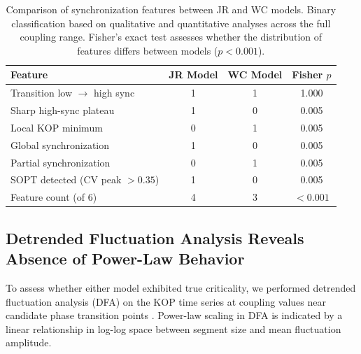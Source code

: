 \documentclass[11pt]{article}
\begin{document}
\begin{table}[H]
\centering
\caption{Comparison of synchronization features between JR and WC models. Binary classification based on qualitative and quantitative analyses across the full coupling range. Fisher's exact test assesses whether the distribution of features differs between models ($p < 0.001$).}
\label{tab:sync_comparison}
\begin{tabular}{lccc}
\toprule
Feature & JR Model & WC Model & Fisher $p$ \\
\midrule
Transition low $\to$ high sync & 1 & 1 & 1.000 \\
Sharp high-sync plateau & 1 & 0 & 0.005 \\
Local KOP minimum & 0 & 1 & 0.005 \\
Global synchronization & 1 & 0 & 0.005 \\
Partial synchronization & 0 & 1 & 0.005 \\
SOPT detected (CV peak $> 0.35$) & 1 & 0 & 0.005 \\
\midrule
Feature count (of 6) & 4 & 3 & $< 0.001$ \\
\bottomrule
\end{tabular}
\end{table}

\subsection{Detrended Fluctuation Analysis Reveals Absence of Power-Law Behavior}

To assess whether either model exhibited true criticality, we performed detrended fluctuation analysis (DFA) on the KOP time series at coupling values near candidate phase transition points \citep{peng1994mosaic}. Power-law scaling in DFA is indicated by a linear relationship in log-log space between segment size and mean fluctuation amplitude.
\end{document}
